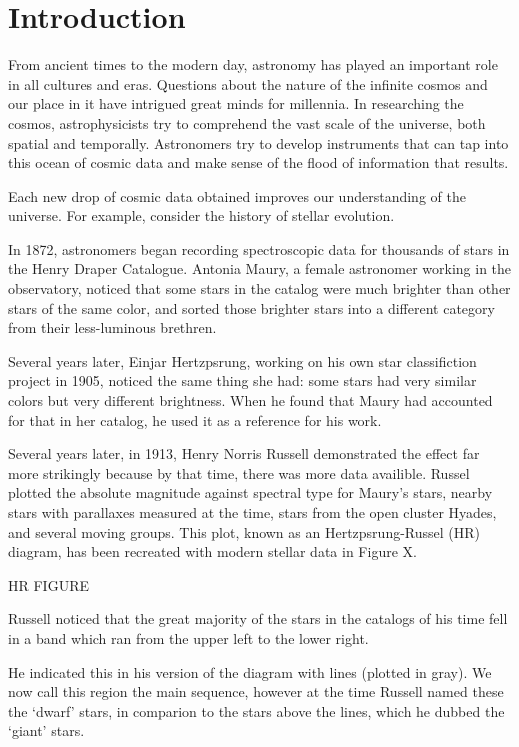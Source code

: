 \chapter{Introduction}
\label{cp.intro}

From ancient times to the modern day, astronomy has played an important role in all cultures and eras.
Questions about the nature of the infinite cosmos and our place in it have intrigued great minds for millennia.
In researching the cosmos, astrophysicists try to comprehend the vast scale of the universe, both spatial and temporally.
Astronomers try to develop instruments that can tap into this ocean of cosmic data and make sense of the flood of information that results.

Each new drop of cosmic data obtained improves our understanding of the universe.
For example, consider the history of stellar evolution.

In 1872, astronomers began recording spectroscopic data for thousands of stars in the Henry Draper Catalogue.
Antonia Maury, a female astronomer working in the observatory, noticed that some stars in the catalog were much brighter than other stars of the same color, and sorted those brighter stars into a different category from their less-luminous brethren.

Several years later, Einjar Hertzpsrung, working on his own star classifiction project in 1905, noticed the same thing she had: some stars had very similar colors but very different brightness.
When he found that Maury had accounted for that in her catalog, he used it as a reference for his work.

Several years later, in 1913, Henry Norris Russell demonstrated the effect far more strikingly because by that time, there was more data availible. Russel plotted the absolute magnitude against spectral type for Maury's stars, nearby stars with parallaxes measured at the time, stars from the open cluster Hyades, and several moving groups.
This plot, known as an Hertzpsrung-Russel (HR) diagram, has been recreated with modern stellar data in Figure X.

HR FIGURE


 Russell noticed that the great majority of the stars in the catalogs of his time fell in a band which ran from the upper left to the lower right.

 He indicated this in his version of the diagram with lines (plotted in gray).
 We now call this region the main sequence, however at the time Russell named these the `dwarf' stars, in comparion to the stars above the lines, which he dubbed the `giant' stars.



